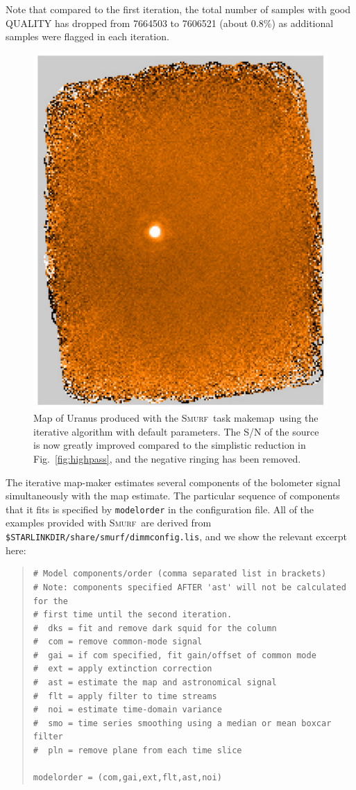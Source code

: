 \documentclass[twoside,11pt]{article}
\newcommand{\xref}[3]{#1}
\renewcommand{\_}{\texttt{\symbol{95}}}
\newenvironment{myquote}{\begin{quote}\begin{small}}{\end{small}\end{quote}}
\newcommand{\smurf}{\xref{\textsc{Smurf}}{sun258}{}}
\newcommand{\task}[1]{\textsf{#1}}
\newcommand{\makemap}{\xref{\task{makemap}}{sun258}{MAKEMAP}}
\begin{document}
Note that compared to the first iteration, the total number of samples
with good QUALITY has dropped from 7664503 to 7606521 (about 0.8\%) as
additional samples were flagged in each iteration.

\begin{figure}
\begin{center}
\includegraphics[width=0.5\linewidth]{sc19_map_iterate}
\caption{Map of Uranus produced with the \smurf\ task \makemap\ using
  the iterative algorithm with default parameters. The S/N of the
  source is now greatly improved compared to the simplistic reduction
  in Fig.~\ref{fig:highpass}, and the negative ringing has been
  removed.}
\label{fig:itermap}
\end{center}
\end{figure}

The iterative map-maker estimates several components of the bolometer
signal simultaneously with the map estimate. The particular sequence
of components that it fits is specified by \texttt{modelorder} in the
configuration file. All of the examples provided with \smurf\ are
derived from \texttt{\$STARLINK\_DIR/share/smurf/dimmconfig.lis}, and
we show the relevant excerpt here:

\begin{myquote}
\begin{verbatim}
# Model components/order (comma separated list in brackets)
# Note: components specified AFTER 'ast' will not be calculated for the
# first time until the second iteration.
#  dks = fit and remove dark squid for the column
#  com = remove common-mode signal
#  gai = if com specified, fit gain/offset of common mode
#  ext = apply extinction correction
#  ast = estimate the map and astronomical signal
#  flt = apply filter to time streams
#  noi = estimate time-domain variance
#  smo = time series smoothing using a median or mean boxcar filter
#  pln = remove plane from each time slice

modelorder = (com,gai,ext,flt,ast,noi)
\end{verbatim}
\end{myquote}
\end{document}
